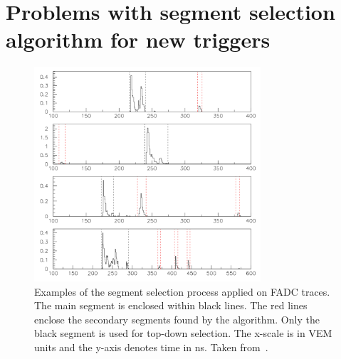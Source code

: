 \chapter{Problems with segment selection algorithm for new triggers} 
\label{sec:app_3}
\begin{figure}[t!]
\centering
\includegraphics[width=0.75\textwidth]{thesis_figures/App3/Segment_selection.png}
\caption{Examples of the segment selection process applied on FADC traces. The main segment is enclosed within black lines. The red lines enclose the secondary segments found by the algorithm. Only the black segment is used for top-down selection. The x-scale is in VEM units and the y-axis denotes time in ns. Taken from~\cite{gap_segment_selection}.}
\label{fig:segment_selection}
\end{figure}

